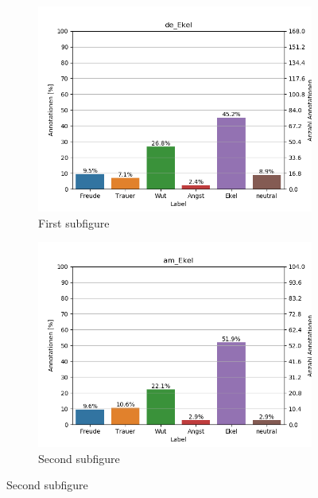 \documentclass[11pt,a4paper,headsepline,twoside,toc=bibliography]{scrreprt}
\begin{document}
\begin{figure}[t!] %
	\begin{subfigure}{0.48\textwidth}
		\includegraphics[width=\linewidth]{plots/de_Ekel.png}
		\caption{First subfigure} \label{fig:de_E}
	\end{subfigure}\hspace*{\fill}
	\begin{subfigure}{0.48\textwidth}
		\includegraphics[width=\linewidth]{plots/am_Ekel.png}
		\caption{Second subfigure} \label{fig:am_E}
	\end{subfigure}
	

\end{figure}
\end{document}
